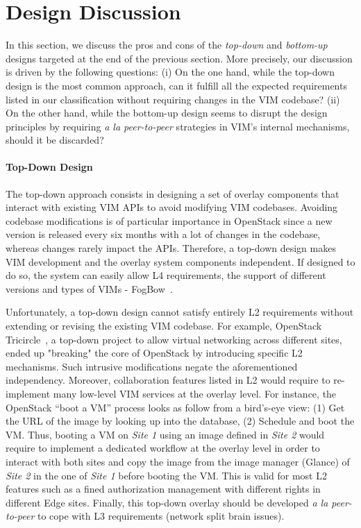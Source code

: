 
\section{Design Discussion}
\label{sec:design_discussion}

In this section, we discuss the pros and cons of the \emph{top-down} and
\emph{bottom-up} designs targeted at the end of the previous section.
More precisely, our discussion is driven by the following questions: (i) On the
one hand, while the top-down design is the most common approach, can it fulfill
all the expected requirements listed in our classification without requiring
changes in the VIM codebase? (ii) On the other hand, while the bottom-up design
seems to disrupt the design principles by requiring \emph{a la peer-to-peer}
strategies in VIM's internal mechanisms, should it be discarded?

\paragraph{Top-Down Design}
The top-down approach consists in designing a set of overlay components that
interact with existing VIM APIs to avoid modifying VIM codebases.
Avoiding codebase modifications is of particular importance in OpenStack since
a new version is released every six months with a lot of changes in the
codebase, whereas changes rarely impact the APIs. Therefore, a top-down design
makes VIM development and the overlay system components independent. If
designed to do so, the system can easily allow L4 requirements, \ie the
support of different versions and types of VIMs - \eg
FogBow~\cite{brasileiro2016fogbow}.

Unfortunately, a top-down design cannot satisfy entirely L2 requirements
without extending or revising the existing VIM codebase. For example,
OpenStack Tricircle~\cite{tricircle}, a top-down project to allow
virtual networking across different sites, ended up "breaking" the
core of OpenStack by introducing specific L2 mechanisms. Such
intrusive modifications negate the aforementioned independency.
%
Moreover, collaboration features listed in L2 would require to
re-implement many low-level VIM services at the overlay level. For
instance, the OpenStack ``boot a VM'' process looks as follow from a
bird's-eye view: (1) Get the URL of the image by looking up into the
database, (2) Schedule and boot the VM. Thus, booting a VM on
\emph{Site 1} using an image defined in \emph{Site 2} would require to
implement a dedicated workflow at the overlay level in order to
interact with both sites and copy the image from the image manager
(\ie Glance) of \emph{Site 2} in the one of \emph{Site 1} before booting the VM. 
%
This is valid for most L2 features such as a fined authorization management
with different rights in different Edge sites.
%
Finally, this top-down overlay should be developed \emph{a la
  peer-to-peer} to cope with L3 requirements (\ie network split brain
issues).


